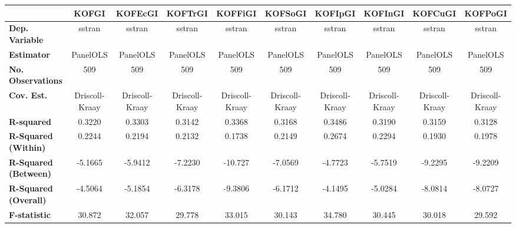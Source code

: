 \begin{center}
\begin{tabular}{lccccccccc}
\toprule
                                   &   \textbf{KOFGI}   &  \textbf{KOFEcGI}  &  \textbf{KOFTrGI}  &  \textbf{KOFFiGI}  &  \textbf{KOFSoGI}  &  \textbf{KOFIpGI}  &  \textbf{KOFInGI}  &  \textbf{KOFCuGI}  &  \textbf{KOFPoGI}   \\
\midrule
\textbf{Dep. Variable}             &       sstran       &       sstran       &       sstran       &       sstran       &       sstran       &       sstran       &       sstran       &       sstran       &       sstran        \\
\textbf{Estimator}                 &      PanelOLS      &      PanelOLS      &      PanelOLS      &      PanelOLS      &      PanelOLS      &      PanelOLS      &      PanelOLS      &      PanelOLS      &      PanelOLS       \\
\textbf{No. Observations}          &        509         &        509         &        509         &        509         &        509         &        509         &        509         &        509         &        509          \\
\textbf{Cov. Est.}                 &   Driscoll-Kraay   &   Driscoll-Kraay   &   Driscoll-Kraay   &   Driscoll-Kraay   &   Driscoll-Kraay   &   Driscoll-Kraay   &   Driscoll-Kraay   &   Driscoll-Kraay   &   Driscoll-Kraay    \\
\textbf{R-squared}                 &       0.3220       &       0.3303       &       0.3142       &       0.3368       &       0.3168       &       0.3486       &       0.3190       &       0.3159       &       0.3128        \\
\textbf{R-Squared (Within)}        &       0.2244       &       0.2194       &       0.2132       &       0.1738       &       0.2149       &       0.2674       &       0.2294       &       0.1930       &       0.1978        \\
\textbf{R-Squared (Between)}       &      -5.1665       &      -5.9412       &      -7.2230       &      -10.727       &      -7.0569       &      -4.7723       &      -5.7519       &      -9.2295       &      -9.2209        \\
\textbf{R-Squared (Overall)}       &      -4.5064       &      -5.1854       &      -6.3178       &      -9.3806       &      -6.1712       &      -4.1495       &      -5.0284       &      -8.0814       &      -8.0727        \\
\textbf{F-statistic}               &       30.872       &       32.057       &       29.778       &       33.015       &       30.143       &       34.780       &       30.445       &       30.018       &       29.592        \\

\end{tabular}
\end{center}
